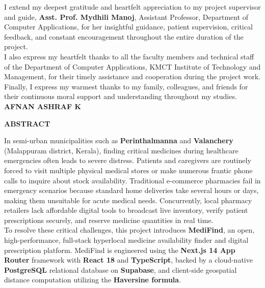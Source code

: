 \documentclass[12pt,a4paper]{report}
\begin{document}
\noindent I extend my deepest gratitude and heartfelt appreciation to my project supervisor and guide, \textbf{Asst. Prof. Mydhili Manoj}, Assistant Professor, Department of Computer Applications, for her insightful guidance, patient supervision, critical feedback, and constant encouragement throughout the entire duration of the project.\\[0.5cm]

\noindent I also express my heartfelt thanks to all the faculty members and technical staff of the Department of Computer Applications, KMCT Institute of Technology and Management, for their timely assistance and cooperation during the project work.\\[0.5cm]

\noindent Finally, I express my warmest thanks to my family, colleagues, and friends for their continuous moral support and understanding throughout my studies.\\[2.0cm]

\noindent
\raggedleft
\textbf{AFNAN ASHRAF K}

\newpage
\thispagestyle{plain}
\begin{center}
    {\Large \textbf{ABSTRACT}}\\[0.8cm]
\end{center}

\noindent In semi-urban municipalities such as \textbf{Perinthalmanna} and \textbf{Valanchery} (Malappuram district, Kerala), finding critical medicines during healthcare emergencies often leads to severe distress. Patients and caregivers are routinely forced to visit multiple physical medical stores or make numerous frantic phone calls to inquire about stock availability. Traditional e-commerce pharmacies fail in emergency scenarios because standard home deliveries take several hours or days, making them unsuitable for acute medical needs. Concurrently, local pharmacy retailers lack affordable digital tools to broadcast live inventory, verify patient prescriptions securely, and reserve medicine quantities in real time.\\[0.4cm]

\noindent To resolve these critical challenges, this project introduces \textbf{MediFind}, an open, high-performance, full-stack hyperlocal medicine availability finder and digital prescription platform. MediFind is engineered using the \textbf{Next.js 14 App Router} framework with \textbf{React 18} and \textbf{TypeScript}, backed by a cloud-native \textbf{PostgreSQL} relational database on \textbf{Supabase}, and client-side geospatial distance computation utilizing the \textbf{Haversine formula}.\\[0.4cm]
\end{document}
